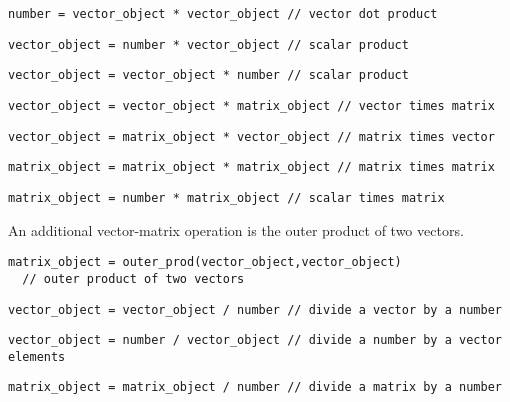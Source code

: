 \documentclass{admbmanual}
\begin{document}
\begin{lstlisting}
number = vector_object * vector_object // vector dot product
\end{lstlisting}
\begin{lstlisting}
vector_object = number * vector_object // scalar product
\end{lstlisting}
\begin{lstlisting}
vector_object = vector_object * number // scalar product
\end{lstlisting}
\begin{lstlisting}
vector_object = vector_object * matrix_object // vector times matrix
\end{lstlisting}
\begin{lstlisting}
vector_object = matrix_object * vector_object // matrix times vector
\end{lstlisting}
\begin{lstlisting}
matrix_object = matrix_object * matrix_object // matrix times matrix
\end{lstlisting}
\begin{lstlisting}
matrix_object = number * matrix_object // scalar times matrix
\end{lstlisting}
An additional vector-matrix operation is the outer product of two vectors.
\begin{lstlisting}
matrix_object = outer_prod(vector_object,vector_object)
  // outer product of two vectors
\end{lstlisting}

\begin{lstlisting}
vector_object = vector_object / number // divide a vector by a number
\end{lstlisting}
\begin{lstlisting}
vector_object = number / vector_object // divide a number by a vector elements
\end{lstlisting}
\begin{lstlisting}
matrix_object = matrix_object / number // divide a matrix by a number
\end{lstlisting}
\end{document}
